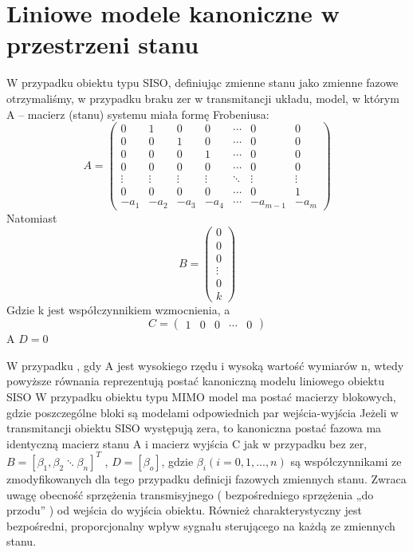 \documentclass{article}
\begin{document}
	\section{Liniowe modele kanoniczne w przestrzeni stanu}
		W przypadku obiektu typu SISO, definiując zmienne stanu jako zmienne fazowe
		otrzymaliśmy, w przypadku braku zer w transmitancji układu, model, w którym A –
		macierz (stanu) systemu miała formę Frobeniusa:
		\begin{equation}
			A=\begin{pmatrix}
			  0    &   1    &   0    &   0    & \cdots &   0      &   0    \\
			  0    &   0    &   1    &   0    & \cdots &   0      &   0    \\
			  0    &   0    &   0    &   1    & \cdots &   0      &   0    \\
			  0    &   0    &   0    &   0    & \cdots &   0      &   0    \\
			\vdots & \vdots & \vdots & \vdots & \ddots & \vdots   & \vdots \\
			  0    &   0    &   0    &   0    & \cdots &   0      &   1    \\
			 -a_{1}&  -a_{2}&  -a_{3}&  -a_{4}& \cdots & -a_{m-1} & -a_{m}
			\end{pmatrix}
		\end{equation}
		Natomiast 
		\begin{equation}
			B = 
			\begin{pmatrix}
				0 \\
				0 \\
				0 \\
				\vdots \\
				0 \\
				k 
			\end{pmatrix}
		\end{equation}
		Gdzie k jest współczynnikiem wzmocnienia, a 
		\begin{equation}
			C = 
			\begin{pmatrix}
				1 & 0 & 0 & \cdots & 0
			\end{pmatrix}
		\end{equation}
		A $D=0$
 
		W przypadku , gdy A jest wysokiego rzędu i wysoką wartość wymiarów n, wtedy
		powyższe równania reprezentują postać kanoniczną modelu liniowego obiektu SISO
		\newline
		W przypadku obiektu typu MIMO model ma postać macierzy blokowych,
		gdzie poszczególne bloki są modelami odpowiednich par wejścia-wyjścia
		Jeżeli w transmitancji obiektu SISO występują zera, to kanoniczna postać fazowa ma identyczną
		macierz stanu A i macierz wyjścia C jak w przypadku bez zer, $B = [ \beta_1, \beta_2 \ddots \beta_n]^T$ , $D = [ \beta_o ]$, gdzie
		$\beta_i (i=0, 1, . . . , n)$ są współczynnikami ze zmodyfikowanych dla
		tego przypadku definicji
		fazowych zmiennych stanu. Zwraca uwagę obecność sprzężenia transmisyjnego (
		bezpośredniego sprzężenia „do przodu” ) od wejścia do wyjścia obiektu. Również
		charakterystyczny jest bezpośredni, proporcjonalny wpływ sygnału sterującego na każdą
		ze zmiennych stanu.
\end{document}
